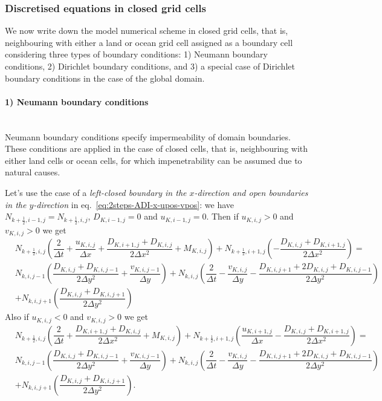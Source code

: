 \subsubsection{Discretised equations in closed grid cells}
\label{sec:boundary-conditions}

We now write down the model numerical scheme in closed grid cells, that is, neighbouring with either a land or ocean grid cell assigned as a boundary cell considering three types of boundary conditions: 1) Neumann boundary conditions, 2) Dirichlet boundary conditions, and 3) a special case of Dirichlet boundary conditions in the case of the global domain. 

\paragraph{1) Neumann boundary conditions} \mbox{}\\

\noindent Neumann boundary conditions specify impermeability of domain boundaries. These conditions are applied in the case of closed cells, that is, neighbouring with either land cells or ocean cells, for which impenetrability can be assumed due to natural causes. 

Let's use the case of a \textit{left-closed boundary in the $x$-direction and open boundaries in the $y$-direction} in eq.~\eqref{eq:2steps-ADI-x-upos-vpos}: we have 
$N_{k+\frac{1}{2},i-1,j}= N_{k+\frac{1}{2},i,j}$, $D_{K,i-1,j}=0$ and 
$u_{K,i-1,j}=0$. 
Then if $u_{K,i,j}>0$ and $v_{K,i,j}>0$ we get
\begin{align}
  \label{eq:2steps-ADI-x-upos-vpos+Neumann}
  \nonumber
    &N_{k+\frac{1}{2},i,j}  \left(
      \dfrac{2}{\Delta t} 
    +\dfrac{u_{K,i,j}}{\Delta x}
    +\dfrac{D_{K,i+1,j}+D_{K,i,j}}{2\Delta x^2}
    + M_{K,i,j}    
    \right)
    + N_{k+\frac{1}{2},i+1,j} \left(
      -\dfrac{D_{K,i,j}+D_{K,i+1,j}}{2\Delta x^2}
    \right) 
    = \\
    \nonumber
    &N_{k,i,j-1}\left(\dfrac{D_{K,i,j}+D_{K,i,j-1}}{2\Delta y^2}+\dfrac{v_{K,i,j-1}}{\Delta y}\right)
    + N_{k,i,j}\left(\dfrac{2}{\Delta t}-\dfrac{v_{K,i,j}}{\Delta y}-\dfrac{D_{K,i,j+1}+2D_{K,i,j}+D_{K,i,j-1}}{2\Delta y^2} \right)\\
    &+N_{k,i,j+1}\left(\dfrac{D_{K,i,j}+D_{K,i,j+1}}{2\Delta y^2}\right)
\end{align}
%
Also if $u_{K,i,j}<0$ and $v_{K,i,j}>0$ we get
%
\begin{align}
  \label{eq:2steps-ADI-x-uneg-vpos+Neumann}
  \nonumber
    &N_{k+\frac{1}{2},i,j}  \left(
      \dfrac{2}{\Delta t} 
    +\dfrac{D_{K,i+1,j}+D_{K,i,j}}{2\Delta x^2}
    + M_{K,i,j}    
    \right)
    + N_{k+\frac{1}{2},i+1,j} \left(
      \dfrac{u_{K,i+1,j}}{\Delta x}
      -\dfrac{D_{K,i,j}+D_{K,i+1,j}}{2\Delta x^2}
    \right) 
    = \\
    \nonumber
    &N_{k,i,j-1}\left(\dfrac{D_{K,i,j}+D_{K,i,j-1}}{2\Delta y^2}+\dfrac{v_{K,i,j-1}}{\Delta y}\right)
    + N_{k,i,j}\left(\dfrac{2}{\Delta t}-\dfrac{v_{K,i,j}}{\Delta y}-\dfrac{D_{K,i,j+1}+2D_{K,i,j}+D_{K,i,j-1}}{2\Delta y^2} \right)\\
    &+N_{k,i,j+1}\left(\dfrac{D_{K,i,j}+D_{K,i,j+1}}{2\Delta y^2}\right).
\end{align}

